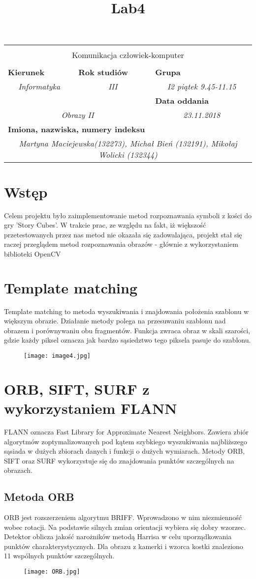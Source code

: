\documentclass[polish,a4paper]{article}
\title{Lab4}
\newcommand{\PRzFieldDsc}[1]{\sffamily\bfseries\scriptsize #1}
\newcommand{\PRzFieldCnt}[1]{\textit{#1}}
\newcommand{\PRzHeading}[8]{
\begin{center}
\begin{tabular}{ p{0.32\textwidth} p{0.15\textwidth} p{0.15\textwidth} p{0.12\textwidth} p{0.12\textwidth} }

  &   &   &   &   \\
\hline
\multicolumn{5}{|c|}{}\\[-1ex]
\multicolumn{5}{|c|}{{\LARGE #1}}\\
\multicolumn{5}{|c|}{}\\[-1ex]

\hline
\multicolumn{2}{|l|}{\PRzFieldDsc{Kierunek}}		& \multicolumn{1}{|l|}{\PRzFieldDsc{Rok studiów}}	& \multicolumn{2}{|l|}{\PRzFieldDsc{Grupa}} \\
\multicolumn{2}{|c|}{\PRzFieldCnt{#2}}				& \multicolumn{1}{|c|}{\PRzFieldCnt{#4}}		& \multicolumn{2}{|c|}{\PRzFieldCnt{#5}} \\

\hline
\multicolumn{3}{|l|}{\PRzFieldDsc{}}		& \multicolumn{2}{|l|}{\PRzFieldDsc{Data oddania}} \\
\multicolumn{3}{|c|}{\PRzFieldCnt{#6}}				& \multicolumn{2}{|c|}{\PRzFieldCnt{#7}} \\

\hline
\multicolumn{5}{|l|}{\PRzFieldDsc{Imiona, nazwiska, numery indeksu}}\\
\multicolumn{5}{|c|}{\PRzFieldCnt{#8}}\\



\hline
\end{tabular}
\end{center}
}
\begin{document}
\PRzHeading{Komunikacja człowiek-komputer}{Informatyka}{--}{III}{I2 piątek 9.45-11.15}{Obrazy II}{23.11.2018}{Martyna Maciejewska(132273), Michał Bień (132191), Mikołaj Wolicki (132344)}{}


\section{Wstęp}
Celem projektu było zaimplementowanie metod rozpoznawania symboli z kości do gry 'Story Cubes'. W trakcie prac, ze względu na fakt, iż większość przetestowanych przez nas metod nie okazała się zadowalająca, projekt stał się raczej przeglądem metod rozpoznawania obrazów - głównie z wykorzystaniem biblioteki OpenCV

\section{Template matching}
Template matching to metoda wyszukiwania i znajdowania położenia szablonu w większym obrazie. Działanie metody polega na przesuwaniu szablonu nad obrazem i porównywaniu obu fragmentów. Funkcja zwraca obraz w skali szarości, gdzie każdy piksel oznacza jak bardzo sąsiedztwo tego piksela pasuje do szablonu\cite{matching}.
\begin{figure}[H]
\centering
\texttt{[image: image4.jpg]}
\end{figure}
\section{ORB, SIFT, SURF z wykorzystaniem FLANN}
FLANN oznacza Fast Library for Approximate Nearest Neighbors. Zawiera zbiór algorytmów zoptymalizowanych pod kątem szybkiego wyszukiwania najbliższego sąsiada w dużych zbiorach danych  i funkcji o dużych wymiarach. 
Metody ORB, SIFT oraz SURF wykorzystuje się do znajdowania punktów szczególnych na obrazach. 
\subsection{Metoda ORB}
ORB jest rozszerzeniem algorytmu BRIFF\cite{brief}. Wprowadzono w nim niezmienność wobec rotacji. Na podstawie silnych zmian orientacji wybiera się dobry wzorzec. Detektor oblicza jakość narożników metodą Harrisa w celu uporządkowania punktów charakterystycznych\cite{keypoint}.
\newline
\newline
Dla obrazu z kamerki i wzorca kostki znaleziono 11 wspólnych punktów szczególnych. 
\begin{figure}[H]
\centering
\texttt{[image: ORB.jpg]}
\end{figure}
\newpage
\end{document}
